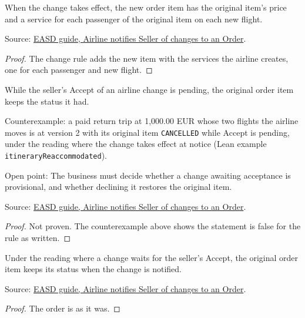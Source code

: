 \begin{theorem}
  \label{thm:airline-change-new-item}
  When the change takes effect, the new order item has the original item's
  price and a service for each passenger of the original item on each new
  flight.

  Source: \href{https://standards.atlassian.net/wiki/spaces/EASD/pages/815202352}{EASD guide, Airline notifies Seller of changes to an Order}.
\end{theorem}
\begin{proof}
  The change rule adds the new item with the services the airline creates,
  one for each passenger and new flight.
\end{proof}

\begin{theorem}
  \label{thm:airline-change-original-kept}
  While the seller's Accept of an airline change is pending, the original
  order item keeps the status it had.

  Counterexample: a paid return trip at 1,000.00 EUR whose two flights the
  airline moves is at version 2 with its original item \texttt{CANCELLED}
  while Accept is pending, under the reading where the change takes effect
  at notice (Lean example \texttt{itineraryReaccommodated}).

  Open point: The business must decide whether a change awaiting acceptance
  is provisional, and whether declining it restores the original item.

  Source: \href{https://standards.atlassian.net/wiki/spaces/EASD/pages/815202352}{EASD guide, Airline notifies Seller of changes to an Order}.
\end{theorem}
\begin{proof}
  Not proven.  The counterexample above shows the statement is false for the
  rule as written.
\end{proof}

\begin{theorem}
  \label{thm:airline-change-original-kept-of-acceptance}
  Under the reading where a change waits for the seller's Accept, the
  original order item keeps its status when the change is notified.

  Source: \href{https://standards.atlassian.net/wiki/spaces/EASD/pages/815202352}{EASD guide, Airline notifies Seller of changes to an Order}.
\end{theorem}
\begin{proof}
  The order is as it was.
\end{proof}

